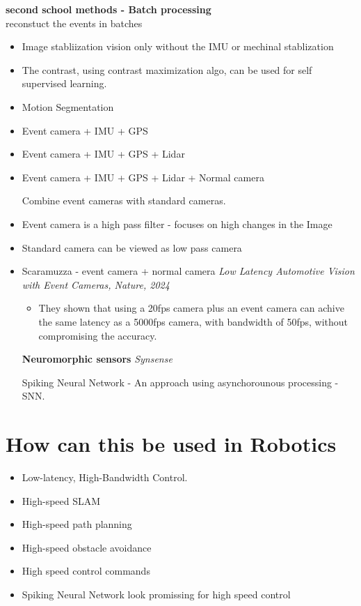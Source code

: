 \documentclass{article}
\begin{document}
\textbf{second school methods - Batch processing}
\\
reconstuct the events in batches
\begin{itemize}
    \item  Image stabliization vision only without the IMU or mechinal stablization
    \item The contrast, using contrast maximization algo, can be used for self supervised learning.
    \item Motion Segmentation
    \item Event camera + IMU + GPS
    \item Event camera + IMU + GPS + Lidar
    \item Event camera + IMU + GPS + Lidar + Normal camera


Combine event cameras with standard cameras. 
\item Event camera is a high pass filter - focuses on high changes in the Image
\item Standard camera can be viewed as low pass camera 
\item Scaramuzza - event camera + normal camera \textit{Low Latency Automotive Vision with Event Cameras, Nature, 2024}
\begin{itemize}
    \item They shown that using a 20fps camera plus an event camera can achive the same latency as a 5000fps camera, with bandwidth of 50fps, without compromising the accuracy.
\end{itemize}
    
\textbf{Neuromorphic sensors}
\textit{Synsense}

Spiking Neural Network - An approach using asynchorounous processing - SNN.
\end{itemize}

\section{How can this be used in Robotics}
\begin{itemize}
    \item Low-latency, High-Bandwidth Control.
    \item High-speed SLAM
    \item High-speed path planning
    \item High-speed obstacle avoidance
    \item High speed control commands
    \item Spiking Neural Network look promissing for high speed control
\end{itemize}
    
\end{document}
